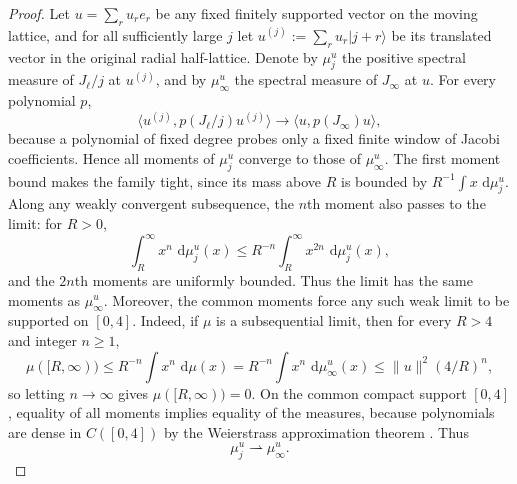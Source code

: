 \documentclass[11pt]{article}
\numberwithin{equation}{section}
\newcommand{\dd}{\,\mathrm d}
\theoremstyle{definition}
\begin{document}
\begin{proof}
Let $u=\sum_r u_r e_r$ be any fixed finitely supported vector on the moving
lattice, and for all sufficiently large $j$ let
$u^{(j)}:=\sum_r u_r|j+r\rangle$ be its translated vector in the original
radial half-lattice.  Denote by $\mu_j^u$ the positive spectral measure of
$J_\ell/j$ at $u^{(j)}$, and by $\mu_\infty^u$ the spectral measure of
$J_\infty$ at $u$.  For every polynomial $p$,
\begin{equation}
 \langle u^{(j)},p(J_\ell/j)u^{(j)}\rangle
 \longrightarrow
 \langle u,p(J_\infty)u\rangle,
 \label{eq:polynomial_quadratic_convergence}
\end{equation}
because a polynomial of fixed degree probes only a fixed finite window of
Jacobi coefficients.  Hence all moments of $\mu_j^u$ converge to those of
$\mu_\infty^u$.  The first moment bound makes the family tight, since its
mass above $R$ is bounded by $R^{-1}\int x\,\dd\mu_j^u$.  Along any weakly
convergent subsequence, the $n$th moment also passes to the limit: for $R>0$,
\begin{equation}
 \int_R^\infty x^n\,\dd\mu_j^u(x)
 \le R^{-n}\int_R^\infty x^{2n}\,\dd\mu_j^u(x),
\end{equation}
and the $2n$th moments are uniformly bounded.  Thus the limit has the same
moments as $\mu_\infty^u$.  Moreover, the common moments force any such weak limit to be supported on
$[0,4]$.  Indeed, if $\mu$ is a subsequential limit, then for every $R>4$ and
integer $n\ge1$,
\begin{equation}
 \mu([R,\infty))
 \le R^{-n}\int x^n\,\dd\mu(x)
 =R^{-n}\int x^n\,\dd\mu_\infty^u(x)
 \le \|u\|^2(4/R)^n,
\end{equation}
so letting $n\to\infty$ gives $\mu([R,\infty))=0$.  On the common compact
support $[0,4]$, equality of all moments implies equality of the measures,
because polynomials are dense in $C([0,4])$ by the Weierstrass approximation
theorem \cite{Rudin1976}.  Thus
\begin{equation}
 \mu_j^u\rightharpoonup\mu_\infty^u.
\end{equation}


\end{proof}
\end{document}
